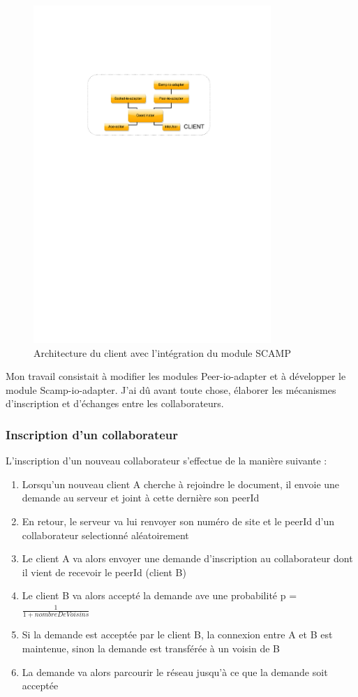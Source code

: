 \documentclass{tnreport}
\begin{document}
\begin{figure}[!h]
  \centering
  \includegraphics[width=9cm]{figures/MUTE-archi-scamp}
  \caption{Architecture du client avec l'intégration du module SCAMP}
  \label{fig:mute-archi-scamp}
\end{figure}

Mon travail consistait à modifier les modules Peer-io-adapter et à développer le module Scamp-io-adapter. J'ai dû avant toute chose, élaborer les mécanismes d'inscription et d'échanges entre les collaborateurs.

\subsubsection{Inscription d'un collaborateur}
L'inscription d'un nouveau collaborateur s'effectue de la manière suivante :
\begin{enumerate}
  \item Lorsqu'un nouveau client A cherche à rejoindre le document, il envoie une demande au serveur et joint à cette dernière son peerId
  \item En retour, le serveur va lui renvoyer son numéro de site et le peerId d'un collaborateur selectionné aléatoirement
  \item Le client A va alors envoyer une demande d'inscription au collaborateur dont il vient de recevoir le peerId (client B)
  \item Le client B va alors accepté la demande ave une probabilité p = $\frac{1}{1 + nombreDeVoisins}$
  \item Si la demande est acceptée par le client B, la connexion entre A et B est maintenue, sinon la demande est transférée à un voisin de B
  \item La demande va alors parcourir le réseau jusqu'à ce que la demande soit acceptée\\
\end{enumerate}
\end{document}
